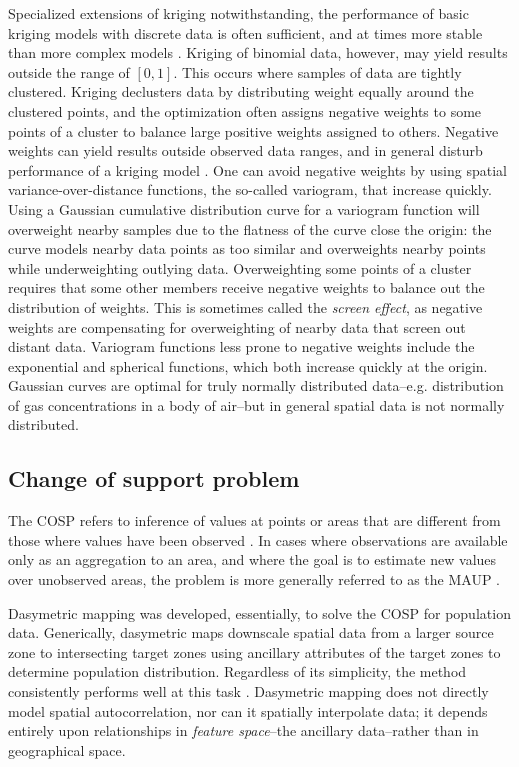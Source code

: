 \documentclass[]{interact}
\theoremstyle{plain}%
\theoremstyle{definition}
\theoremstyle{remark}
\begin{document}
Specialized extensions of kriging notwithstanding, the performance of basic kriging models with discrete data is often sufficient, and at times more stable than more complex models \citep{oliver98}.  Kriging of binomial data, however, may yield results outside the range of $[0, 1]$.  This occurs where samples of data are tightly clustered.  Kriging declusters data by distributing weight equally around the clustered points, and the optimization often assigns negative weights to some points of a cluster to balance large positive weights assigned to others.  Negative weights can yield results outside observed data ranges, and in general disturb performance of a kriging model \citep{duetsch96}.  One can avoid negative weights by using spatial variance-over-distance functions, the so-called variogram, that increase quickly.  Using a Gaussian cumulative distribution curve for a variogram function will overweight nearby samples due to the flatness of the curve close the origin: the curve models nearby data points as too similar and overweights nearby points while underweighting outlying data.  Overweighting some points of a cluster requires that some other members receive negative weights to balance out the distribution of weights.  This is sometimes called the {\em screen effect}, as negative weights are compensating for overweighting of nearby data that screen out distant data.  Variogram functions less prone to negative weights include the exponential and spherical functions, which both increase quickly at the origin.  Gaussian curves are optimal for truly normally distributed data--e.g. distribution of gas concentrations in a body of air--but in general spatial data is not normally distributed.


\subsection{Change of support problem}

The COSP refers to inference of values at points or areas that are different from those where values have been observed \citep{gelfand01}.  In cases where observations are available only as an aggregation to an area, and where the goal is to estimate new values over unobserved areas, the problem is more generally referred to as the MAUP \citep{cressie96}.  %

Dasymetric mapping was developed, essentially, to solve the COSP for population data.  Generically, dasymetric maps downscale spatial data from a larger source zone to intersecting target zones using ancillary attributes of the target zones to determine population distribution.  Regardless of its simplicity, the method consistently performs well at this task \citep{eicher01, holt11, barrozo16, amos17}.  Dasymetric mapping does not directly model spatial autocorrelation, nor can it spatially interpolate data; it depends entirely upon relationships in {\em feature space}--the ancillary data--rather than in geographical space.
\end{document}
